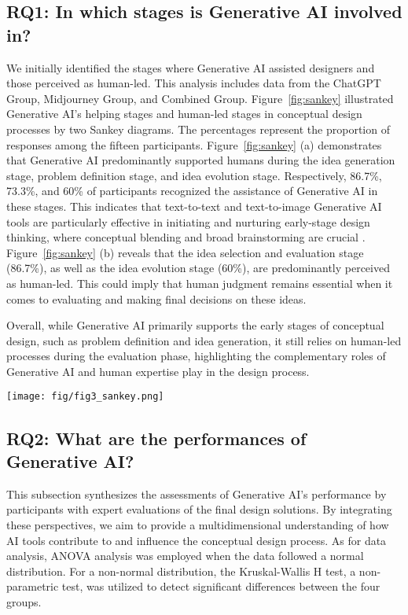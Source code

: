 \documentclass{dsj}
\begin{document}
\subsection{RQ1: In which stages is Generative AI involved in?}
\label{result_RQ1}
We initially identified the stages where Generative AI assisted designers and those perceived as human-led. This analysis includes data from the ChatGPT Group, Midjourney Group, and Combined Group. Figure~\ref{fig:sankey} illustrated Generative AI’s helping stages and human-led stages in conceptual design processes by two Sankey diagrams. The percentages represent the proportion of responses among the fifteen participants. Figure~\ref{fig:sankey} (a) demonstrates that Generative AI predominantly supported humans during the idea generation stage, problem definition stage, and idea evolution stage. Respectively, 86.7\%, 73.3\%, and 60\% of participants recognized the assistance of Generative AI in these stages. This indicates that text-to-text and text-to-image Generative AI tools are particularly effective in initiating and nurturing early-stage design thinking, where conceptual blending and broad brainstorming are crucial \citep{wang2023popblends}. Figure~\ref{fig:sankey} (b) reveals that the idea selection and evaluation stage (86.7\%), as well as the idea evolution stage (60\%), are predominantly perceived as human-led. This could imply that human judgment remains essential when it comes to evaluating and making final decisions on these ideas. 

Overall, while Generative AI primarily supports the early stages of conceptual design, such as problem definition and idea generation, it still relies on human-led processes during the evaluation phase, highlighting the complementary roles of Generative AI and human expertise play in the design process.

\begin{figure*}[htp]
    \centering
    \texttt{[image: fig/fig3\_sankey.png]}
    \caption{Horizontal Sankey diagrams representing (a) the comparison of group types in relation to Generative AI’s helping stages and (b) the comparison of group types in relation to human-led stages. (Percentages in the figure represent the proportion of responses among the fifteen participants in Generative AI-assisted groups.)}
    \label{fig:sankey}
    \vspace{-0.1in}
\end{figure*}

\subsection{RQ2: What are the performances of Generative AI?}
This subsection synthesizes the assessments of Generative AI's performance by participants with expert evaluations of the final design solutions. By integrating these perspectives, we aim to provide a multidimensional understanding of how AI tools contribute to and influence the conceptual design process. As for data analysis, ANOVA analysis was employed when the data followed a normal distribution. For a non-normal distribution, the Kruskal-Wallis H test, a non-parametric test, was utilized to detect significant differences between the four groups.
\end{document}

